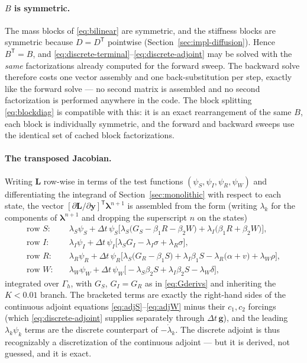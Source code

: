 \documentclass[11pt]{article}
\begin{document}
\paragraph{$B$ is symmetric.} The mass blocks of \eqref{eq:bilinear} are symmetric, and the stiffness blocks are symmetric because $D=D^{\mathsf T}$ pointwise (Section~\ref{sec:impl-diffusion}). Hence $B^{\mathsf T}=B$, and \eqref{eq:discrete-terminal}--\eqref{eq:discrete-adjoint} may be solved with the \emph{same} factorizations already computed for the forward sweep. The backward solve therefore costs one vector assembly and one back-substitution per step, exactly like the forward solve --- no second matrix is assembled and no second factorization is performed anywhere in the code. The block splitting \eqref{eq:blockdiag} is compatible with this: it is an exact rearrangement of the same $B$, each block is individually symmetric, and the forward and backward sweeps use the identical set of cached block factorizations.

\paragraph{The transposed Jacobian.} Writing $\mathbf{L}$ row-wise in terms of the test functions $(\psi_S,\psi_I,\psi_R,\psi_W)$ and differentiating the integrand of Section~\ref{sec:monolithic} with respect to each state, the vector $[\partial\mathbf{L}/\partial\mathbf{y}]^{\mathsf T}\boldsymbol\lambda^{n+1}$ is assembled from the form (writing $\lambda_k$ for the components of $\boldsymbol\lambda^{n+1}$ and dropping the superscript $n$ on the states)
\begin{align}
\text{row }S:\quad & \lambda_S\psi_S + \Delta t\,\psi_S\Big[\lambda_S\big(G_S - \beta_1 R - \beta_2 W\big) + \lambda_I\big(\beta_1 R + \beta_2 W\big)\Big],\\
\text{row }I:\quad & \lambda_I\psi_I + \Delta t\,\psi_I\Big[\lambda_S G_I - \lambda_I\sigma + \lambda_R\sigma\Big],\\
\text{row }R:\quad & \lambda_R\psi_R + \Delta t\,\psi_R\Big[\lambda_S\big(G_R - \beta_1 S\big) + \lambda_I\beta_1 S - \lambda_R\big(\alpha + v\big) + \lambda_W\rho\Big],\\
\text{row }W:\quad & \lambda_W\psi_W + \Delta t\,\psi_W\Big[-\lambda_S\beta_2 S + \lambda_I\beta_2 S - \lambda_W\delta\Big],
\end{align}
integrated over $\Gamma_h$, with $G_S$, $G_I=G_R$ as in \eqref{eq:Gderivs} and inheriting the $K<0.01$ branch. The bracketed terms are exactly the right-hand sides of the continuous adjoint equations \eqref{eq:adjS}--\eqref{eq:adjW} minus their $c_1,c_2$ forcings (which \eqref{eq:discrete-adjoint} supplies separately through $\Delta t\,\mathbf{g}$), and the leading $\lambda_k\psi_k$ terms are the discrete counterpart of $-\dot\lambda_k$. The discrete adjoint is thus recognizably a discretization of the continuous adjoint --- but it is derived, not guessed, and it is exact.
\end{document}
